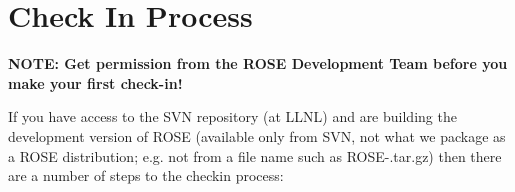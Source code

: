 \section{Check In Process}

{\bf NOTE: Get permission from the ROSE Development Team before you make your first check-in!}

   If you have access to the SVN repository (at LLNL) and are building the development 
version of ROSE (available only from SVN, not what we package as a ROSE distribution; 
e.g. not from a file name such as ROSE-\VersionNumber.tar.gz) then 
there are a number of steps to the checkin process:
